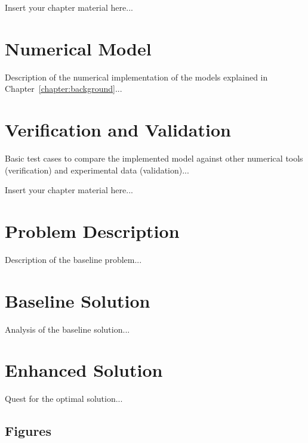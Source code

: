 Insert your chapter material here...

\section{Numerical Model}
\label{section:model}

Description of the numerical implementation of the models explained in Chapter~\ref{chapter:background}...


\section{Verification and Validation}
\label{section:verification}

Basic test cases to compare the implemented model against other numerical tools (verification) and experimental data (validation)...



Insert your chapter material here...


\section{Problem Description}
\label{section:problem}

Description of the baseline problem...


\section{Baseline Solution}
\label{section:baseline}

Analysis of the baseline solution...


\section{Enhanced Solution}
\label{section:enhanced}

Quest for the optimal solution...


\subsection{Figures}
\label{subsection:figures}

